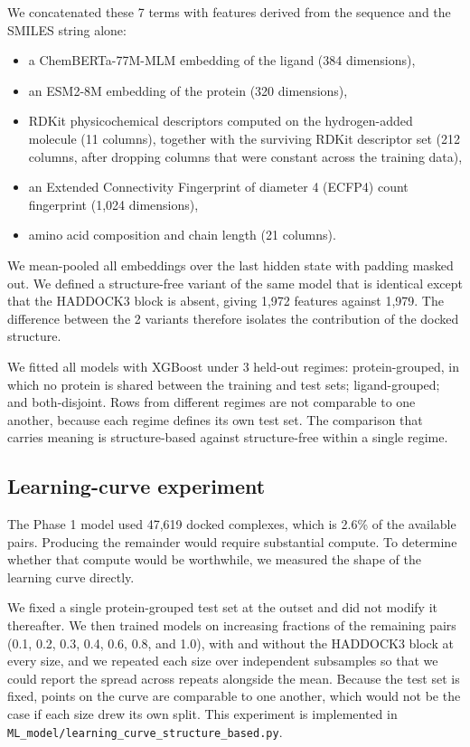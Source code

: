 \documentclass[11pt]{article}
\begin{document}
We concatenated these 7 terms with features derived from the sequence and the
SMILES string alone:

\begin{itemize}
  \item a ChemBERTa-77M-MLM embedding of the ligand (384 dimensions),
  \item an ESM2-8M embedding of the protein (320 dimensions),
  \item RDKit physicochemical descriptors computed on the hydrogen-added
        molecule (11 columns), together with the surviving RDKit descriptor set
        (212 columns, after dropping columns that were constant across the
        training data),
  \item an Extended Connectivity Fingerprint of diameter 4 (ECFP4) count
        fingerprint (1,024 dimensions),
  \item amino acid composition and chain length (21 columns).
\end{itemize}

We mean-pooled all embeddings over the last hidden state with padding masked
out. We defined a structure-free variant of the same model that is identical
except that the HADDOCK3 block is absent, giving 1,972 features against 1,979.
The difference between the 2 variants therefore isolates the contribution of
the docked structure.

We fitted all models with XGBoost under 3 held-out regimes: protein-grouped, in
which no protein is shared between the training and test sets; ligand-grouped;
and both-disjoint. Rows from different regimes are not comparable to one
another, because each regime defines its own test set. The comparison that
carries meaning is structure-based against structure-free within a single
regime.

\subsection{Learning-curve experiment}
\label{sec:curve-methods}

The Phase 1 model used 47,619 docked complexes, which is 2.6\% of the available
pairs. Producing the remainder would require substantial compute. To determine
whether that compute would be worthwhile, we measured the shape of the learning
curve directly.

We fixed a single protein-grouped test set at the outset and did not modify it
thereafter. We then trained models on increasing fractions of the remaining
pairs (0.1, 0.2, 0.3, 0.4, 0.6, 0.8, and 1.0), with and without the HADDOCK3
block at every size, and we repeated each size over independent subsamples so
that we could report the spread across repeats alongside the mean. Because the
test set is fixed, points on the curve are comparable to one another, which
would not be the case if each size drew its own split. This experiment is
implemented in \texttt{ML\_model/learning\_curve\_structure\_based.py}.
\end{document}
